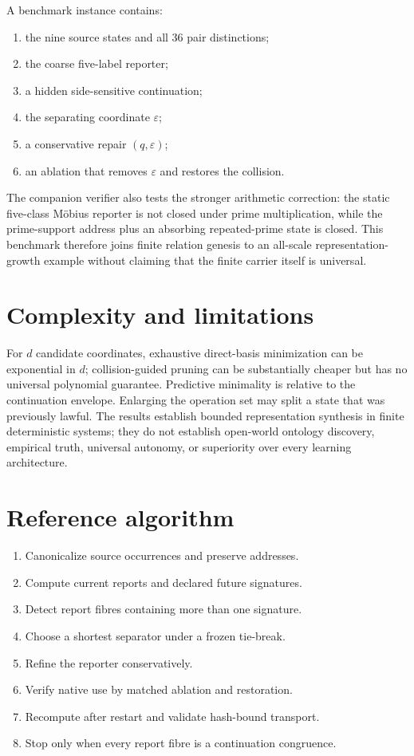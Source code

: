 \documentclass[11pt,a4paper]{article}
\begin{document}
A benchmark instance contains:
\begin{enumerate}
\item the nine source states and all 36 pair distinctions;
\item the coarse five-label reporter;
\item a hidden side-sensitive continuation;
\item the separating coordinate $\varepsilon$;
\item a conservative repair $(q,\varepsilon)$;
\item an ablation that removes $\varepsilon$ and restores the collision.
\end{enumerate}
The companion verifier also tests the stronger arithmetic correction: the static five-class M\"obius reporter is not closed under prime multiplication, while the prime-support address plus an absorbing repeated-prime state is closed. This benchmark therefore joins finite relation genesis to an all-scale representation-growth example without claiming that the finite carrier itself is universal.

\section{Complexity and limitations}
For $d$ candidate coordinates, exhaustive direct-basis minimization can be exponential in $d$; collision-guided pruning can be substantially cheaper but has no universal polynomial guarantee. Predictive minimality is relative to the continuation envelope. Enlarging the operation set may split a state that was previously lawful. The results establish bounded representation synthesis in finite deterministic systems; they do not establish open-world ontology discovery, empirical truth, universal autonomy, or superiority over every learning architecture.

\appendix
\section{Reference algorithm}
\begin{enumerate}
\item Canonicalize source occurrences and preserve addresses.
\item Compute current reports and declared future signatures.
\item Detect report fibres containing more than one signature.
\item Choose a shortest separator under a frozen tie-break.
\item Refine the reporter conservatively.
\item Verify native use by matched ablation and restoration.
\item Recompute after restart and validate hash-bound transport.
\item Stop only when every report fibre is a continuation congruence.
\end{enumerate}
\end{document}
